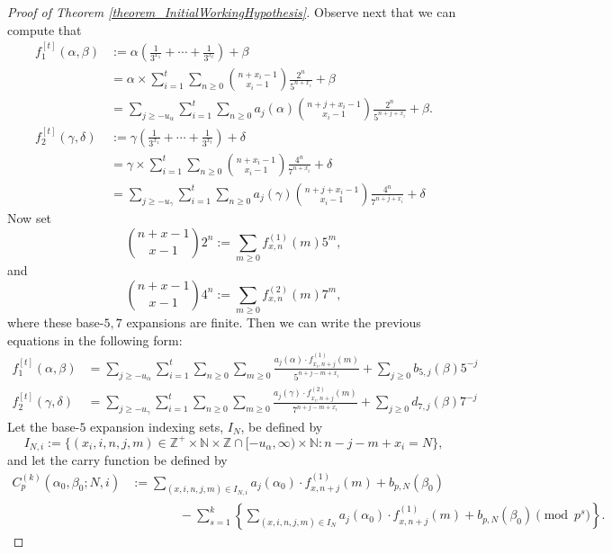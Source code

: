 \documentclass[12pt]{article}
\begin{document}
\begin{proof}[Proof of Theorem \ref{theorem_InitialWorkingHypothesis}]
Observe next that we can compute that 
\begin{align*} 
f_1^{[t]}(\alpha,\beta) & := \alpha\left(\frac{1}{3^{x_1}}+\cdots+\frac{1}{3^{x_t}}\right) + \beta \\ 
     & = \alpha \times \sum_{i=1}^t \sum_{n \geq 0} \binom{n+x_i-1}{x_i-1} \frac{2^n}{5^{n+x_i}} + \beta \\ 
     & = 
      \sum_{j \geq -u_{\alpha}} \sum_{i=1}^t \sum_{n \geq 0} a_j(\alpha) 
      \binom{n+j+x_i-1}{x_i-1} \frac{2^n}{5^{n+j+x_i}} + \beta. \\ 
f_2^{[t]}(\gamma,\delta) & := \gamma\left(\frac{1}{3^{x_1}}+\cdots+\frac{1}{3^{x_t}}\right) + \delta \\ 
     & = \gamma \times \sum_{i=1}^t \sum_{n \geq 0} \binom{n+x_i-1}{x_i-1} \frac{4^n}{7^{n+x_i}} + \delta \\ 
     & = 
      \sum_{j \geq -u_{\gamma}} \sum_{i=1}^t \sum_{n \geq 0} a_j(\gamma) 
      \binom{n+j+x_i-1}{x_i-1} \frac{4^n}{7^{n+j+x_i}} + \delta
\end{align*} 
Now set $$\binom{n+x-1}{x-1} 2^n := \sum_{m \geq 0} f_{x,n}^{(1)}(m) 5^m,$$ and 
$$\binom{n+x-1}{x-1} 4^n := \sum_{m \geq 0} f_{x,n}^{(2)}(m) 7^m,$$
where these base-$5,7$ expansions 
are finite. Then we can write the previous equations in the following form: 
\begin{align*} 
f_1^{[t]}(\alpha,\beta) & = 
      \sum_{j \geq -u_{\alpha}} \sum_{i=1}^t \sum_{n \geq 0} \sum_{m \geq 0} 
      \frac{a_j(\alpha) \cdot f_{x_i,n+j}^{(1)}(m)}{5^{n+j-m+x_i}} + 
      \sum_{j \geq 0} b_{5,j}(\beta) 5^{-j} \\ 
f_2^{[t]}(\gamma,\delta) & = 
      \sum_{j \geq -u_{\gamma}} \sum_{i=1}^t \sum_{n \geq 0} \sum_{m \geq 0} 
      \frac{a_j(\gamma) \cdot f_{x_i,n+j}^{(2)}(m)}{7^{n+j-m+x_i}} + 
      \sum_{j \geq 0} d_{7,j}(\beta) 7^{-j} 
\end{align*} 
Let the base-$5$ expansion indexing sets, $I_N$, be defined by 
\[
I_{N,i} := \{(x_i,i,n,j,m) \in \mathbb{Z}^+ \times \mathbb{N} \times 
     \mathbb{Z} \cap [-u_{\alpha}, \infty) \times 
     \mathbb{N}: n-j-m+x_i = N\}, 
\] 
and let the carry function be defined by 
\begin{align*} 
C_p^{(k)}(\alpha_0,\beta_0; N, i) & := \sum_{(x,i,n,j,m) \in I_{N,i}} a_j(\alpha_0) \cdot 
     f_{x,n+j}^{(1)}(m)+b_{p,N}(\beta_0) \\ 
     & \phantom{:=\qquad\ } - 
     \sum_{s=1}^k \left\{\sum_{(x,i,n,j,m) \in I_N} a_j(\alpha_0) \cdot f_{x,n+j}^{(1)}(m)+b_{p,N}(\beta_0) 
     \pmod{p^s}\right\}. 

\end{align*}
\end{proof}
\end{document}
